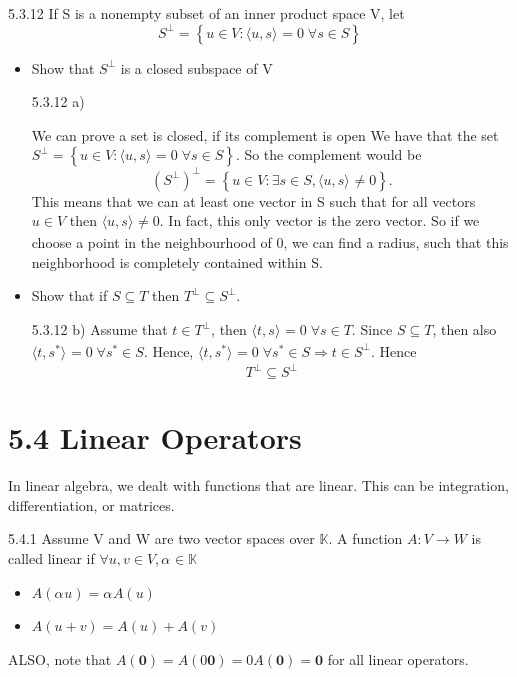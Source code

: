 \documentclass[a4paper,norsk]{article}
\begin{document}
\begin{oppgavebox}{5.3.12}{}
If S is a nonempty subset of an inner product space V, let
\[
    S ^{\perp} = \left\{ u \in V : \langle u, s \rangle_{  } = 0 \; \forall s \in S \right\} 
\]

\begin{itemize}
  \item[a)] Show that $ S ^{\perp}  $ is a closed subspace of V
  \begin{proofbox}{5.3.12 a)}{}

    We can prove a set is closed, if its complement is open
    We have that the set $ S ^{\perp} = \left\{ u \in  V : \langle u, s \rangle_{  } =0 \; \forall  s \in S \right\}   $. So the complement would be  
    $$ \left( S ^{\perp}  \right) ^{\perp} = \left\{ u \in V : \exists s \in  S, \langle u, s \rangle_{  } \neq 0 \right\}.    $$
    This means that we can at least one vector in S such that for all vectors $ u \in V $ then $ \langle u, s \rangle_{  } \neq 0 $. In fact, this only vector is the zero vector. So if we choose a point in the neighbourhood of 0, we can find a radius, such that this neighborhood is completely contained within S.
  \end{proofbox}
  \item[b)] Show that if $ S \subseteq T $  then $ T ^{\perp} \subseteq S ^{\perp}   $.
  \begin{proofbox}{5.3.12 b)}{}
    Assume that $ t \in  T ^{\perp}  $, then $ \langle t, s  \rangle_{  } = 0 \; \forall s \in T $. Since $ S \subseteq T $, then also $ \langle t, s^* \rangle_{  } = 0 \; \forall s^* \in S $. Hence, $ \langle t, s^* \rangle_{  } = 0 \; \forall s^* \in S \Rightarrow t \in S^{\perp} $. Hence
    \[
        T^{\perp} \subseteq S ^{\perp} 
    \]
  \end{proofbox}
\end{itemize}
\end{oppgavebox}


\section*{5.4 Linear Operators}

In linear algebra, we dealt with functions that are linear. This can be integration, differentiation, or matrices. 


\begin{definitionbox}{5.4.1}{}
Assume V and W are two vector spaces over $ \mathbb{K}  $. A function $ A : V \to W $ is called linear if $ \forall u, v \in V, \alpha_{}^{} \in \mathbb{K}  $ 
\begin{itemize}
  \item[i)] $ A \left( \alpha_{}^{} u \right) = \alpha_{}^{} A \left( u \right)   $ 
  \item[ii)] $ A \left( u + v \right) = A \left( u \right) + A \left( v \right)  $ 
\end{itemize}

ALSO, note that $ A \left( \textbf{0} \right) = A \left( 0 \textbf{0} \right) = 0 A \left( \textbf{0} \right) = \textbf{0}   $ for all linear operators.
\end{definitionbox}
\end{document}

